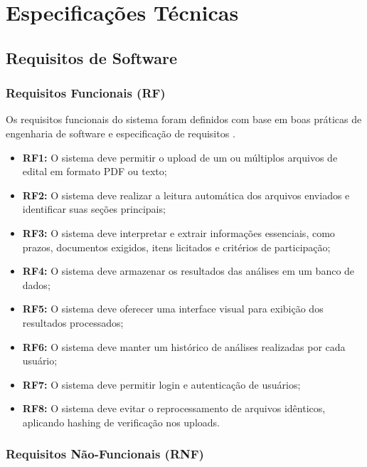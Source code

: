 \chapter{Especificações Técnicas}


\section{Requisitos de Software}

\subsection{Requisitos Funcionais (RF)}

Os requisitos funcionais do sistema foram definidos com base em boas práticas de engenharia de software e especificação de requisitos \cite{sommerville_engenharia_software_2011}.

\begin{itemize}
    \item \textbf{RF1:} O sistema deve permitir o upload de um ou múltiplos arquivos de edital em formato PDF ou texto;
    \item \textbf{RF2:} O sistema deve realizar a leitura automática dos arquivos enviados e identificar suas seções principais;
    \item \textbf{RF3:} O sistema deve interpretar e extrair informações essenciais, como prazos, documentos exigidos, itens licitados e critérios de participação;
    \item \textbf{RF4:} O sistema deve armazenar os resultados das análises em um banco de dados;
    \item \textbf{RF5:} O sistema deve oferecer uma interface visual para exibição dos resultados processados;
    \item \textbf{RF6:} O sistema deve manter um histórico de análises realizadas por cada usuário;
    \item \textbf{RF7:} O sistema deve permitir login e autenticação de usuários;
    \item \textbf{RF8:} O sistema deve evitar o reprocessamento de arquivos idênticos, aplicando hashing de verificação nos uploads.
\end{itemize}

\subsection{Requisitos Não-Funcionais (RNF)}


